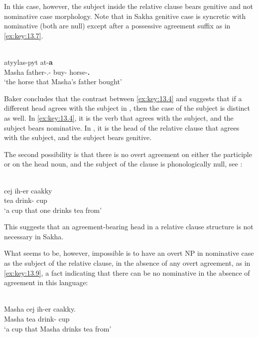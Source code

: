 \documentclass[output=paper]{langsci/langscibook}
\begin{document}
In this case, however, the subject inside the relative clause bears genitive
and not nominative case morphology. Note that in Sakha genitive case is
syncretic with nominative (both are null) except after a possessive agreement
suffix as in \eqref{ex:key:13.7}.

\ea%
    \label{ex:key:13.7} \parencite[30]{Baker2015}\\
     atyylas-pyt at-\textbf{a}\\
          {} Masha father-\Tsg.\Poss{}-\Gen{} {} buy-\Ptcp{}  horse-\textbf{\Tsg.\Poss{}}\\
    \glt  ‘the horse that Masha’s father bought’  \citet[30]{Baker2015}
\z

Baker concludes that the contrast between \eqref{ex:key:13.4} and
 suggests that if a different head agrees with the subject in
, then the case of the subject is distinct as well. In
\eqref{ex:key:13.4}, it is the verb that agrees with the subject, and the
subject bears nominative. In , it is the
head of the relative clause that agrees with the subject, and the subject bears
genitive.

The second possibility is that there is no overt agreement on either the
participle or on the head noun, and the subject of the clause is phonologically
null, see :

\ea%
    \label{ex:key:13.8} \parencite[30]{Baker2015}\\
    \gll    cej ih-er caakky\\
            tea drink-\Aor{}  cup\\
    \glt    ‘a cup that one drinks tea from’
\z

This suggests that an agreement-bearing head in a relative clause structure is
not necessary in Sakha.

What seems to be, however, impossible is to have an overt NP in nominative case
as the subject of the relative clause, in the absence of any overt agreement,
as in \eqref{ex:key:13.9}, a fact indicating that there can be no nominative in the
absence of agreement in this language:

\ea%
    \label{ex:key:13.9} \parencite[30]{Baker2015}\\
    \gll \llap{*}Masha cej ih-er caakky.\\
          Masha tea drink-\Aor{}      cup\\
    \glt  ‘a cup that Masha drinks tea from’
\z
\end{document}
